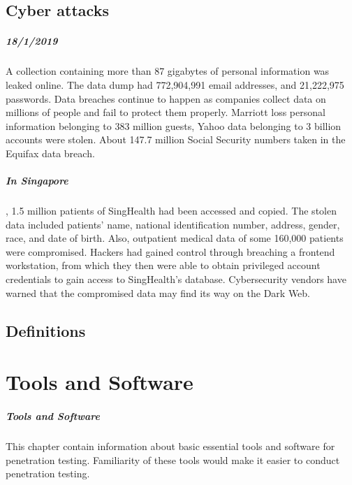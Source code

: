 \documentclass[7x9]{times}
\begin{document}
\section{Cyber attacks}

\paragraph{18/1/2019} A collection containing more than 87 gigabytes of personal information was leaked online. The data dump had 772,904,991 email addresses, and 21,222,975 passwords. Data breaches continue to happen as companies collect data on millions of people and fail to protect them properly. Marriott loss personal information belonging to 383 million guests, Yahoo data belonging to 3 billion accounts were stolen. About 147.7 million Social Security numbers taken in the Equifax data breach.

\paragraph{In Singapore}, 1.5 million patients of SingHealth had been accessed and copied. The stolen data included patients' name, national identification number, address, gender, race, and date of birth. Also, outpatient medical data of some 160,000 patients were compromised. Hackers had gained control through breaching a frontend workstation, from which they then were able to obtain privileged account credentials to gain access to SingHealth's database. Cybersecurity vendors have warned that the compromised data may find its way on the Dark Web.


\section{Definitions}




\chapter{Tools and Software}


\paragraph{Tools and Software} This chapter contain
information about basic essential tools and software for penetration
testing. Familiarity of these tools would make it easier to conduct
penetration testing.
\end{document}
